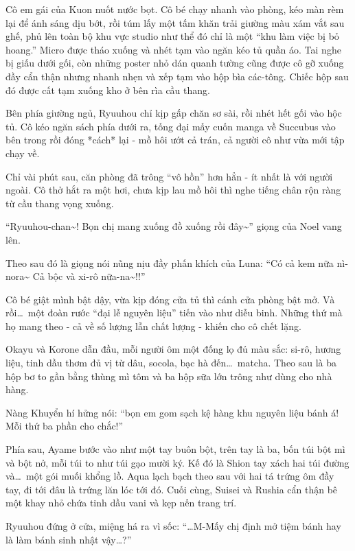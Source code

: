 \documentclass[../main.tex]{subfiles}
\begin{document}
Cô em gái của Kuon nuốt nước bọt. Cô bé chạy nhanh vào phòng, kéo màn rèm lại để ánh sáng dịu bớt, rồi túm lấy một tấm khăn trải giường màu xám vắt sau ghế, phủ lên toàn bộ khu vực studio như thể đó chỉ là một ``khu làm việc bị bỏ hoang.'' Micro được tháo xuống và nhét tạm vào ngăn kéo tủ quần áo. Tai nghe bị giấu dưới gối, còn những poster nhỏ dán quanh tường cũng được cô gỡ xuống đầy cẩn thận nhưng nhanh nhẹn và xếp tạm vào hộp bìa các-tông. Chiếc hộp sau đó được cất tạm xuống kho ở bên rìa cầu thang.

Bên phía giường ngủ, Ryuuhou chỉ kịp gấp chăn sơ sài, rồi nhét hết gối vào hộc tủ. Cô kéo ngăn sách phía dưới ra, tống đại mấy cuốn manga về Succubus vào bên trong rồi đóng *cách* lại - mồ hôi ướt cả trán, cả người cô như vừa mới tập chạy về.

Chỉ vài phút sau, căn phòng đã trông ``vô hồn'' hơn hẳn - ít nhất là với người ngoài. Cô thở hắt ra một hơi, chưa kịp lau mồ hôi thì nghe tiếng chân rộn ràng từ cầu thang vọng xuống.

``Ryuuhou-chan\~{}! Bọn chị mang xuống đồ xuống rồi đây\~{}'' giọng của Noel vang lên.

Theo sau đó là giọng nói nũng nịu đầy phấn khích của Luna: ``Có cả kem nữa nì-nora\~{} Cả bộc và xi-rô nữa-na\~{}!!''

Cô bé giật mình bật dậy, vừa kịp đóng cửa tủ thì cánh cửa phòng bật mở. Và rồi\dots\ một đoàn rước ``đại lễ nguyên liệu'' tiến vào như diễu binh. Những thứ mà họ mang theo - cả về số lượng lẫn chất lượng - khiến cho cô chết lặng.

Okayu và Korone dẫn đầu, mỗi người ôm một đống lọ đủ màu sắc: si-rô, hương liệu, tinh dầu thơm đủ vị từ dâu, socola, bạc hà đến\dots\ matcha. Theo sau là ba hộp bơ to gần bằng thùng mì tôm và ba hộp sữa lớn trông như dùng cho nhà hàng.

Nàng Khuyển hí hửng nói: ``bọn em gom sạch kệ hàng khu nguyên liệu bánh á! Mỗi thứ ba phần cho chắc!''

Phía sau, Ayame bước vào như một tay buôn bột, trên tay là ba, bốn túi bột mì và bột nở, mỗi túi to như túi gạo mười ký. Kế đó là Shion tay xách hai túi đường và\dots\ một gói muối khổng lồ. Aqua lạch bạch theo sau với hai tá trứng ôm đầy tay, đi tới đâu là trứng lăn lóc tới đó. Cuối cùng, Suisei và Rushia cẩn thận bê một khay nhỏ chứa tinh dầu vani và kẹp nến trang trí.

Ryuuhou đứng ở cửa, miệng há ra vì sốc: ``\dots M-Mấy chị định mở tiệm bánh hay là làm bánh sinh nhật vậy\dots?''
\end{document}
